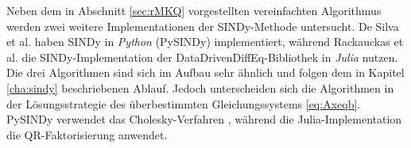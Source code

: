 Neben dem in Abschnitt \ref{sec:rMKQ} vorgestellten vereinfachten Algorithmus werden zwei weitere Implementationen der SINDy-Methode untersucht. De Silva et al. \cite{desilva2020} haben SINDy in \textit{Python} (PySINDy) implementiert, während Rackauckas et al.\cite{Rackauckas2020} die SINDy-Implementation der DataDrivenDiffEq-Bibliothek in \textit{Julia} nutzen. Die drei Algorithmen sind sich im Aufbau sehr ähnlich und folgen dem in Kapitel \ref{cha:sindy} beschriebenen Ablauf. Jedoch unterscheiden sich die Algorithmen in der Lösungsstrategie des überbestimmten Gleichungssystems \eqref{eq:Axeqb}. PySINDy verwendet das Cholesky-Verfahren \cite{Krishnamoorthy2011}, während die Julia-Implementation die QR-Faktorisierung \cite{Martinsson2015} anwendet. 